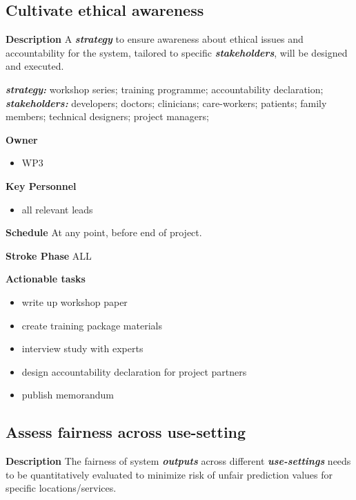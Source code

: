 \documentclass[
  letterpaper,
  DIV=11,
  numbers=noendperiod]{scrreport}
\providecommand{\tightlist}{%
  \setlength{\itemsep}{0pt}\setlength{\parskip}{0pt}}\usepackage{longtable,booktabs,array}
\begin{document}
\hypertarget{cultivate-ethical-awareness}{%
\subsection{Cultivate ethical
awareness}\label{cultivate-ethical-awareness}}

\textbf{Description} A \textbf{\emph{strategy}} to ensure awareness
about ethical issues and accountability for the system, tailored to
specific \textbf{\emph{stakeholders}}, will be designed and executed.

\textbf{\emph{strategy:}} workshop series; training programme;
accountability declaration;\\
\textbf{\emph{stakeholders:}} developers; doctors; clinicians;
care-workers; patients; family members; technical designers; project
managers;

\textbf{Owner}

\begin{itemize}
\tightlist
\item
  WP3
\end{itemize}

\textbf{Key Personnel}

\begin{itemize}
\tightlist
\item
  all relevant leads
\end{itemize}

\textbf{Schedule} At any point, before end of project.

\textbf{Stroke Phase} ALL

\textbf{Actionable tasks}

\begin{itemize}
\tightlist
\item
  write up workshop paper
\item
  create training package materials
\item
  interview study with experts
\item
  design accountability declaration for project partners
\item
  publish memorandum
\end{itemize}

\hypertarget{assess-fairness-across-use-setting}{%
\subsection{Assess fairness across
use-setting}\label{assess-fairness-across-use-setting}}

\textbf{Description} The fairness of system \textbf{\emph{outputs}}
across different \textbf{\emph{use-settings}} needs to be quantitatively
evaluated to minimize risk of unfair prediction values for specific
locations/services.
\end{document}
